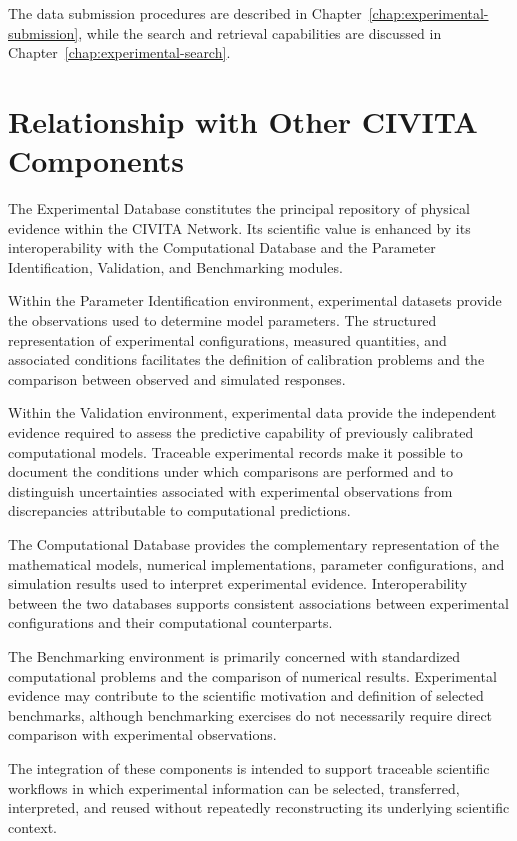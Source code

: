 The data submission procedures are described in
Chapter~\ref{chap:experimental-submission}, while
the search and retrieval capabilities are discussed
in Chapter~\ref{chap:experimental-search}.


\section{Relationship with Other CIVITA Components}

The Experimental Database constitutes the principal
repository of physical evidence within the CIVITA
Network. Its scientific value is enhanced by its
interoperability with the Computational Database
and the Parameter Identification, Validation, and
Benchmarking modules.

Within the Parameter Identification environment,
experimental datasets provide the observations
used to determine model parameters. The structured
representation of experimental configurations,
measured quantities, and associated conditions
facilitates the definition of calibration problems
and the comparison between observed and simulated
responses.

Within the Validation environment, experimental
data provide the independent evidence required
to assess the predictive capability of previously
calibrated computational models. Traceable experimental
records make it possible to document the conditions
under which comparisons are performed and to
distinguish uncertainties associated with experimental
observations from discrepancies attributable to
computational predictions.

The Computational Database provides the complementary
representation of the mathematical models, numerical
implementations, parameter configurations, and
simulation results used to interpret experimental
evidence. Interoperability between the two databases
supports consistent associations between experimental
configurations and their computational counterparts.

The Benchmarking environment is primarily concerned
with standardized computational problems and the
comparison of numerical results. Experimental evidence
may contribute to the scientific motivation and
definition of selected benchmarks, although
benchmarking exercises do not necessarily require
direct comparison with experimental observations.

The integration of these components is intended to
support traceable scientific workflows in which
experimental information can be selected, transferred,
interpreted, and reused without repeatedly reconstructing
its underlying scientific context.

